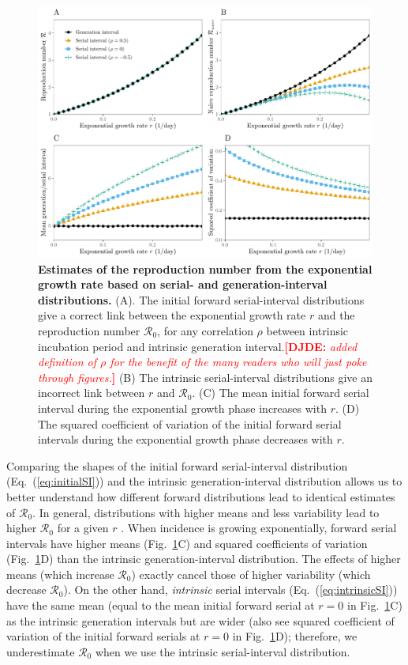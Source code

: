 \documentclass[12pt]{article}
\newcommand{\comment}{\showcomment}
\newcommand{\showcomment}[3]{\textcolor{#1}{\textbf{[#2: }\textsl{#3}\textbf{]}}}
\newcommand{\djde}[1]{\comment{red}{DJDE}{#1}}
\newcommand{\eref}[1]{Eq.~(\ref{eq:#1})}
\newcommand{\fref}[1]{Fig.~\ref{fig:#1}}
\newcommand{\Rx}[1]{\ensuremath{{\mathcal R}_{#1}}\xspace}
\newcommand{\Ro}{\Rx{0}}
\begin{document}
\begin{figure}[!th]
\includegraphics[width=\textwidth]{rR.pdf}
\caption{
\textbf{Estimates of the reproduction number from the exponential growth rate based on serial- and generation-interval distributions.}
(A). The initial forward serial-interval distributions give a correct
link between the exponential growth rate $r$ and the reproduction
number \Ro,
for any correlation $\rho$ between intrinsic incubation period and
intrinsic generation interval.\djde{added definition of $\rho$ for the
benefit of the many readers who will just poke through figures.}
(B) The intrinsic serial-interval distributions give an incorrect link between $r$ and \Ro.
(C) The mean initial forward serial interval during the exponential growth phase increases with $r$.
(D) The squared coefficient of variation of the initial forward serial intervals during the exponential growth phase decreases with $r$.
}
\label{fig:rR}
\end{figure}

Comparing the shapes of the initial forward serial-interval distribution (\eref{initialSI}) and the intrinsic generation-interval distribution allows us to better understand how different forward distributions lead to identical estimates of \Ro.
In general, distributions with higher means and less variability lead to higher \Ro for a given $r$ \citep{wallinga2007generation, weitz2015modeling, park2019practical}.
When incidence is growing exponentially, forward serial intervals have higher means (\fref{rR}C) and squared coefficients of variation (\fref{rR}D) than the intrinsic generation-interval distribution.
The effects of higher means (which increase \Ro) exactly cancel those of higher variability (which decrease \Ro).
On the other hand, \emph{intrinsic} serial intervals (\eref{intrinsicSI}) have the same mean (equal to the mean initial forward serial at $r=0$ in \fref{rR}C) as the intrinsic generation intervals but are wider (also see squared coefficient of variation of the initial forward serials at $r=0$ in \fref{rR}D); 
therefore, we underestimate \Ro when we use the intrinsic serial-interval distribution.
\end{document}

